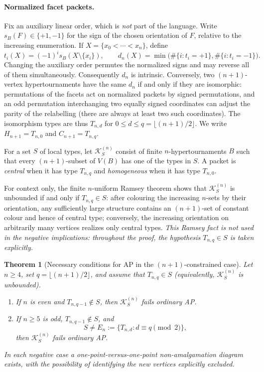 \documentclass[11pt,a4paper]{article}
\newtheorem{theorem}{Theorem}[section]
\theoremstyle{remark}
\newcommand{\K}{\mathcal K}
\begin{document}
\paragraph{Normalized facet packets.}
Fix an auxiliary linear order, which is \emph{not} part of the
language. Write $s_B(F)\in\{+1,-1\}$ for the sign of the chosen
orientation of $F$, relative to the increasing enumeration. If
$X=\{x_0<\cdots<x_n\}$, define
\[
 t_i(X)=(-1)^i s_B(X\setminus\{x_i\}),\qquad
 d_n(X)=\min\bigl(\#\{i:t_i=+1\},\#\{i:t_i=-1\}\bigr).
\]
Changing the auxiliary order permutes the normalized signs and may
reverse all of them simultaneously. Consequently $d_n$ is intrinsic.
Conversely, two $(n+1)$-vertex hypertournaments have the same $d_n$
if and only if they are isomorphic: permutations of the facets act on
normalized packets by signed permutations, and an odd permutation
interchanging two equally signed coordinates can adjust the parity
of the relabelling (there are always at least two such coordinates).
The isomorphism types are thus $T_{n,d}$ for
$0\le d\le q=\lfloor(n+1)/2\rfloor$. We write
$H_{n+1}=T_{n,0}$ and $C_{n+1}=T_{n,q}$.

For a set $S$ of local types, let $\K^{(n)}_S$ consist of finite
$n$-hypertournaments $B$ such that every $(n+1)$-subset of $V(B)$
has one of the types in $S$. A packet is \emph{central} when it has
type $T_{n,q}$ and \emph{homogeneous} when it has type $T_{n,0}$.

For context only, the finite $n$-uniform Ramsey theorem shows that $\K^{(n)}_S$ is unbounded if and
only if $T_{n,q}\in S$: after colouring the increasing $n$-sets by their
orientation, any sufficiently large structure contains an
$(n+1)$-set of constant colour and hence of central type; conversely,
the increasing orientation on arbitrarily many vertices realizes only
central types. \emph{This Ramsey fact is not used in the negative
implications: throughout the proof, the hypothesis $T_{n,q}\in S$
is taken explicitly.}

\begin{theorem}[Necessary conditions for AP in the $(n+1)$-constrained case]
\label{thm:classification}
Let $n\ge4$, set $q=\lfloor(n+1)/2\rfloor$, and assume that
$T_{n,q}\in S$ (equivalently, $\K^{(n)}_S$ is unbounded).
\begin{enumerate}[label=\textup{(\roman*)},leftmargin=15mm]
\item If $n$ is even and $T_{n,q-1}\notin S$, then
$\K^{(n)}_S$ fails ordinary AP.
\item If $n\ge5$ is odd, $T_{n,q-1}\notin S$, and
\[
 S\ne E_n:=\{T_{n,d}: d\equiv q\pmod2\},
\]
then $\K^{(n)}_S$ fails ordinary AP.
\end{enumerate}
In each negative case a one-point-versus-one-point
non-amalgamation diagram exists, with the possibility of identifying
the new vertices explicitly excluded.
\end{theorem}
\end{document}
